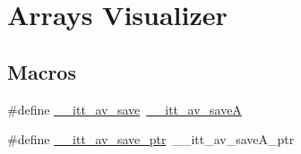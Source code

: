 \hypertarget{group__arrays}{\section{Arrays Visualizer}
\label{group__arrays}
}
\subsection*{Macros}
\begin{DoxyCompactItemize}
\item 
\#define \hyperlink{group__arrays_gaeb4215c9a934c515c6607dd9420e0413}{\-\_\-\-\_\-itt\-\_\-av\-\_\-save}~\hyperlink{group__arrays_ga36a1b96487c316dfa1d773fb5bf5e8af}{\-\_\-\-\_\-itt\-\_\-av\-\_\-save\-A}
\item 
\#define \hyperlink{group__arrays_gab86c8591bc2869f08484d8a792d47b14}{\-\_\-\-\_\-itt\-\_\-av\-\_\-save\-\_\-ptr}~\-\_\-\-\_\-itt\-\_\-av\-\_\-save\-A\-\_\-ptr
\end{DoxyCompactItemize}
